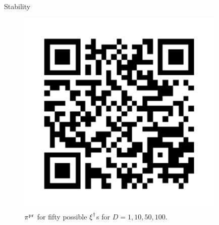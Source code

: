\begin{block}{Stability}
\begin{figure}
        \includegraphics[width=10cm]{ref1}
        \caption{$\operatorname*{\pi^{pr}}$ for fifty possible $\operatorname*{\xi}^\dagger$s for $D=1, 10, 50, 100$.}
    \end{figure}

\end{block}
